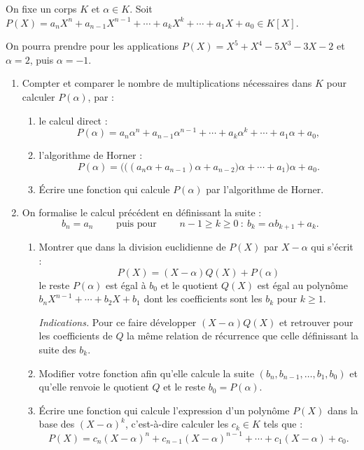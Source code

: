 \documentclass[class=report,crop=false]{standalone}
\begin{document}
\begin{tp}
On fixe un corps $K$ et $\alpha\in K$. Soit $P(X) = a_nX^n+a_{n-1}X^{n-1}+\cdots +a_kX^k+\cdots+ a_1X+a_0 \in K[X]$.

On pourra prendre pour les applications 
$P(X) = X^5 + X^4 - 5X^3 - 3X - 2$ et $\alpha = 2$, puis $\alpha = -1$.

\begin{enumerate}
  \item Compter et comparer le nombre de multiplications nécessaires dans $K$ pour calculer 
  $P(\alpha)$, par :
  \begin{enumerate}
    \item le calcul direct :
    $$P(\alpha) = a_n \alpha^n+a_{n-1} \alpha^{n-1}+\cdots +a_k \alpha^k+\cdots+ a_1 \alpha +a_0,$$
    
    \item l'algorithme de Horner :
    $$P(\alpha) =  \Big(\big((a_n \alpha+a_{n-1})\alpha +a_{n-2} \big) \alpha + \cdots +a_1\Big) \alpha +a_0.$$
    
    \item \'Ecrire une fonction qui calcule $P(\alpha)$ par l'algorithme de Horner.
  \end{enumerate}
  
  \item On formalise le calcul précédent en définissant la suite :
  $$b_{n} = a_n \qquad \text{ puis pour } \qquad n-1\ge k \ge 0\  : \ b_{k} = \alpha b_{k+1}  + a_k.$$
  
  \begin{enumerate}
     
    \item Montrer que dans la division euclidienne de $P(X)$ par $X-\alpha$ qui s'écrit :
    $$P(X) = (X-\alpha) Q(X) + P(\alpha) $$
    le reste $P(\alpha)$ est égal à $b_0$ et le quotient $Q(X)$ est égal au polynôme 
    $b_{n}X^{n-1}+\cdots +b_2X+b_1$ 
    dont les coefficients sont les $b_k$ pour $k\geq 1$.
    
    \emph{Indications.} Pour ce faire développer $(X-\alpha)Q(X)$ et retrouver 
    pour les coefficients de $Q$ la même relation de récurrence que celle 
    définissant la suite des $b_k$.

  
   \item Modifier votre fonction afin qu'elle calcule la suite $(b_{n},b_{n-1},\ldots,b_1,b_0)$
   et qu'elle renvoie le quotient $Q$ et le reste $b_0 = P(\alpha)$.
  
  \item \'Ecrire une fonction qui calcule l'expression d'un polynôme $P(X)$ dans la base
  des $(X-\alpha)^k$, c'est-à-dire calculer les $c_k \in K$ tels que :
  $$P(X) = c_n (X-\alpha)^n+ c_{n-1}(X-\alpha)^{n-1}+ \cdots + c_1(X-\alpha) + c_0.$$
  \end{enumerate}
\end{enumerate}

\end{tp}
\end{document}
